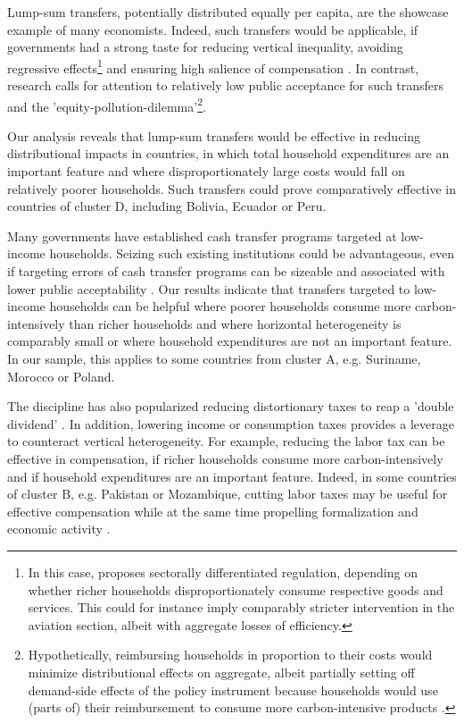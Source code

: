 \documentclass[12pt, a4paper]{article}
\begin{document}
Lump-sum transfers, potentially distributed equally per capita, are the showcase example of many economists. Indeed, such transfers would be applicable, if governments had a strong taste for reducing vertical inequality, avoiding regressive effects\footnote{In this case, \textcite{Stiglitz.2019} proposes sectorally differentiated regulation, depending on whether richer households disproportionately consume respective goods and services. This could for instance imply comparably stricter intervention in the aviation section, albeit with aggregate losses of efficiency.} and ensuring high salience of compensation \autocite{Chetty.2009}. In contrast, research calls for attention to relatively low public acceptance for such transfers and the 'equity-pollution-dilemma'\footnote{Hypothetically, reimbursing households in proportion to their costs would minimize distributional effects on aggregate, albeit partially setting off demand-side effects of the policy instrument because households would use (parts of) their reimbursement to consume more carbon-intensive products \autocite[see also][]{Stiglitz.2019}.}\autocite{Sager.2019}.

Our analysis reveals that lump-sum transfers would be effective in reducing distributional impacts in countries, in which total household expenditures are an important feature and where disproportionately large costs would fall on relatively poorer households. Such transfers could prove comparatively effective in countries of cluster D, including Bolivia, Ecuador or Peru. %

Many governments have established cash transfer programs targeted at low-income households. Seizing such existing institutions could be advantageous, even if targeting errors of cash transfer programs can be sizeable \autocite{Banerjee.2022} and associated with lower public acceptability \autocite{Bah.2019}. Our results indicate that transfers targeted to low-income households can be helpful where poorer households consume more carbon-intensively than richer households and where horizontal heterogeneity is comparably small or where household expenditures are not an important feature. In our sample, this applies to some countries from cluster A, e.g. Suriname, Morocco or Poland.

The discipline has also popularized reducing distortionary taxes to reap a 'double dividend' \autocite{Bovenberg.1996}. In addition, lowering income or consumption taxes provides a leverage to counteract vertical heterogeneity. For example, reducing the labor tax can be effective in compensation, if richer households consume more carbon-intensively and if household expenditures are an important feature. Indeed, in some countries of cluster B, e.g. Pakistan or Mozambique, cutting labor taxes may be useful for effective compensation while at the same time propelling formalization \autocite{Jessen.2021,Rocha.2018} and economic activity \autocite{Ulyssea.2018}.
\end{document}
